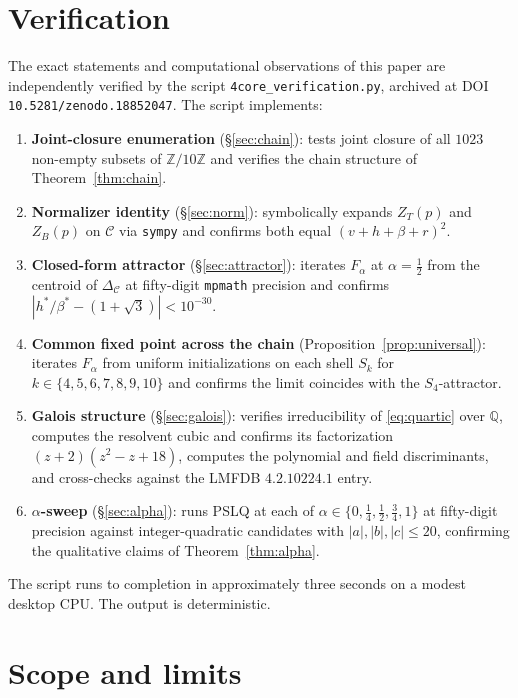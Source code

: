 \documentclass[11pt,reqno]{amsart}
\theoremstyle{plain}
\theoremstyle{definition}
\theoremstyle{remark}
\newcommand{\Z}{\mathbb{Z}}
\newcommand{\Q}{\mathbb{Q}}
\newcommand{\Zten}{\Z/10\Z}
\newcommand{\Cfour}{\mathcal{C}}
\newcommand{\Fmix}{F_{\alpha}}
\begin{document}
\section{Verification}\label{sec:verify}

The exact statements and computational observations of this paper
are independently verified by the script
\texttt{4core\_verification.py},
archived at DOI \texttt{10.5281/zenodo.18852047}. The script
implements:
\begin{enumerate}\setlength\itemsep{0pt}
\item \textbf{Joint-closure enumeration} (\S\ref{sec:chain}):
tests joint closure of all $1023$ non-empty subsets of $\Zten$
and verifies the chain structure of Theorem~\ref{thm:chain}.
\item \textbf{Normalizer identity} (\S\ref{sec:norm}): symbolically
expands $Z_{T}(p)$ and $Z_{B}(p)$ on $\Cfour$ via \texttt{sympy}
and confirms both equal $(v+h+\beta+r)^{2}$.
\item \textbf{Closed-form attractor} (\S\ref{sec:attractor}):
iterates $\Fmix$ at $\alpha=\tfrac12$ from the centroid of
$\Delta_{\Cfour}$ at fifty-digit \texttt{mpmath} precision and
confirms $|h^{*}/\beta^{*}-(1+\sqrt{3})|<10^{-30}$.
\item \textbf{Common fixed point across the chain} (Proposition~\ref{prop:universal}):
iterates $\Fmix$ from uniform initializations on each shell
$S_{k}$ for $k\in\{4,5,6,7,8,9,10\}$ and confirms the limit
coincides with the $S_{4}$-attractor.
\item \textbf{Galois structure} (\S\ref{sec:galois}): verifies
irreducibility of \eqref{eq:quartic} over $\Q$, computes the
resolvent cubic and confirms its factorization
$(z+2)(z^{2}-z+18)$, computes the polynomial and field
discriminants, and cross-checks against the LMFDB
\textnumero $4.2.10224.1$ entry.
\item \textbf{$\alpha$-sweep} (\S\ref{sec:alpha}): runs PSLQ at
each of $\alpha\in\{0,\tfrac14,\tfrac12,\tfrac34,1\}$ at
fifty-digit precision against integer-quadratic candidates with
$|a|,|b|,|c|\leq 20$, confirming the qualitative claims of
Theorem~\ref{thm:alpha}.
\end{enumerate}
The script runs to completion in approximately three seconds on a
modest desktop CPU. The output is deterministic.

\section{Scope and limits}\label{sec:scope}
\end{document}
